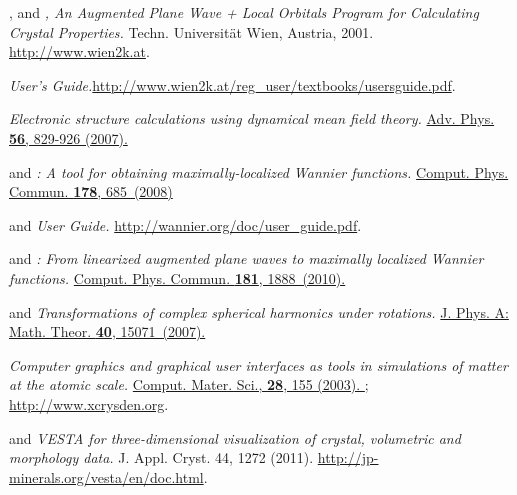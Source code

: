 \begin{thebibliography}{88}
  , and
  \textit{\Wien, An Augmented Plane Wave + Local Orbitals Program for
    Calculating Crystal Properties.}
  Techn. Universität Wien, Austria, 2001.
  \url{http://www.wien2k.at}.

  \textit{\Wien User's Guide.}\linebreak[4]
  \url{http://www.wien2k.at/reg_user/textbooks/usersguide.pdf}.

  \textit{Electronic structure calculations using dynamical mean field
    theory.}
  \href{http://www.tandfonline.com/doi/abs/10.1080/00018730701619647}{%
    Adv. Phys. {\bf 56}, 829-926 (2007).
  }

  and \linebreak[4]
  \textit{\wannier: A tool for obtaining maximally-localized Wannier
    functions.}
  \href{http://www.sciencedirect.com/science/article/pii/S0010465507004936}{%
    Comput. Phys. Commun. \textbf{178}, 685~(2008)
  }

   and \linebreak[4]
  \textit{\Wannier User Guide.}
  \url{http://wannier.org/doc/user_guide.pdf}.

  and 
  \textit{\Wtow: From linearized augmented plane waves to maximally
    localized Wannier functions.}
  \href{http://www.sciencedirect.com/science/article/pii/S0010465510002948}{%
    Comput. Phys. Commun. \textbf{181}, 1888~(2010).%
  }

   and 
  \textit{Transformations of complex spherical harmonics under
    rotations.}
  \href{http://iopscience.iop.org/1751-8121/40/50/011}{%
    J. Phys. A: Math. Theor. \textbf{40}, 15071~(2007).%
  }

  \textit{Computer graphics and graphical user interfaces as tools in
    simulations of matter at the atomic scale.}
  \href{http://www.sciencedirect.com/science/article/pii/S0927025603001046}{%
    Comput. Mater. Sci., {\bf 28}, 155 (2003).%
  }; \url{http://www.xcrysden.org}.

   and 
  \textit{VESTA  for three-dimensional visualization of
    crystal, volumetric and morphology data.}
  J. Appl. Cryst. 44, 1272 (2011).
  \url{http://jp-minerals.org/vesta/en/doc.html}.

\end{thebibliography}

